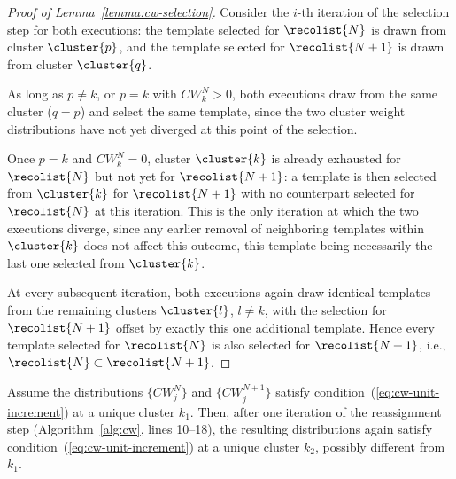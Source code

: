 \begin{proof}[Proof of Lemma~\ref{lemma:cw-selection}]
Consider the $i$-th iteration of the selection step for both executions: the template selected for $\recolist{N}$ is drawn from cluster $\cluster{p}$, and the template selected for $\recolist{N+1}$ is drawn from cluster $\cluster{q}$.

As long as $p \neq k$, or $p = k$ with $CW_{k}^{N} > 0$, both executions draw from the same cluster ($q = p$) and select the same template, since the two cluster weight distributions have not yet diverged at this point of the selection.

Once $p = k$ and $CW_{k}^{N} = 0$, cluster $\cluster{k}$ is already exhausted for $\recolist{N}$ but not yet for $\recolist{N+1}$: a template is then selected from $\cluster{k}$ for $\recolist{N+1}$ with no counterpart selected for $\recolist{N}$ at this iteration. This is the only iteration at which the two executions diverge, since any earlier removal of neighboring templates within $\cluster{k}$ does not affect this outcome, this template being necessarily the last one selected from $\cluster{k}$.

At every subsequent iteration, both executions again draw identical templates from the remaining clusters $\cluster{l}$, $l \neq k$, with the selection for $\recolist{N+1}$ offset by exactly this one additional template. Hence every template selected for $\recolist{N}$ is also selected for $\recolist{N+1}$, i.e., $\recolist{N} \subset \recolist{N+1}$.
\end{proof}

\begin{lemma}
\label{lemma:cw-reassignment}
Assume the distributions $\{CW_j^{N}\}$ and $\{CW_j^{N+1}\}$ satisfy condition~(\ref{eq:cw-unit-increment}) at a unique cluster $k_1$. Then, after one iteration of the reassignment step (Algorithm~\ref{alg:cw}, lines 10--18), the resulting distributions again satisfy condition~(\ref{eq:cw-unit-increment}) at a unique cluster $k_2$, possibly different from $k_1$.
\end{lemma}

